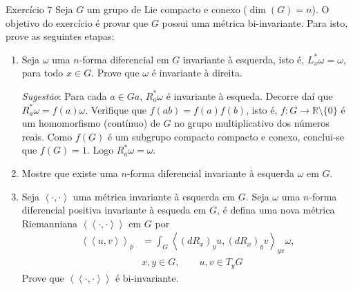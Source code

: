 \begin{thing4}{Exercício 7}\label{exer:7}\leavevmode
Seja \(G\) um grupo de Lie compacto e conexo (\(\dim(G)=n\)). O objetivo do exercício é provar que \(G\) possui uma métrica bi-invariante. Para isto, prove as seguintes etapas:
\begin{enumerate}[label=(\alph*)]
\item Seja \(\omega\) uma \(n\)-forma diferencial em \(G\) invariante à esquerda, isto é, \(L_x^*\omega=\omega\), para todo  \(x\in G\). Prove que \(\omega\) é invariante à direita.

	\textit{Sugestão}: Para cada \(a \in Ga\), \(R_a ^*\omega\) é invariante à esqueda. Decorre daí que \(R_a ^*\omega=f(a)\omega\). Verifique que \(f(ab)=f(a)f(b)\), isto é, \(f:G \to \mathbb{R}\setminus\{0\}\) é um homomorfismo (contínuo) de \(G\) no grupo multiplicativo dos números reais. Como \(f(G)\) é um subgrupo compacto compacto e conexo, conclui-se que \(f(G)=1\). Logo \(R_a ^*\omega=\omega\).
\item Mostre que existe uma \(n\)-forma diferencial invariante à esquerda \(\omega\) em \(G\).
\item Seja \(\left<\cdot,\cdot\right>\) uma métrica invariante à esquerda em \(G\). Seja \(\omega\) uma \(n\)-forma diferencial positiva invariante à esqueda em \(G\), é defina uma nova métrica Riemanniana \(\left<\left<\cdot,\cdot\right>\right>\) em \(G\) por
\begin{align*}\left<\left<u,v\right>\right>_p&=\int_G\left<(d R_x)_yu,(d R_x)_yv\right>_{yx}\omega,\\
	&x,y \in G,\qquad u,v \in T_yG
\end{align*}
Prove que \(\left<\left<\cdot,\cdot\right>\right>\) é bi-invariante.
\end{enumerate}
\end{thing4}
